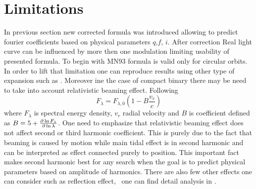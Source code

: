 \documentclass{pracalicmgr}
\begin{document}
\section{Limitations}
In previous section new corrected formula was introduced allowing to predict fourier coefficients based on physical parameters $q$,$f$, $i$. After correction 
Real light curve can be influenced by more then one modulation limiting usability of presented formula. To begin with MN93 formula is valid only for circular orbits. 
In order to lift that limitation one can reproduce results using other type of expansion such as \citet{engel_beer_2020}. Moreover ine the case of compact binary there may be need to take into account
relativistic beaming effect. Following \citet{loeb_periodic_2003} 
\begin{equation}
    F_{\lambda}=F_{\lambda,0}\left(1-B\frac{v_r}{c}\right)
\end{equation}
where $F_\lambda$ is spectral energy density, $v_r$ radial velocity and $B$ is coefficient defined as $B=5+\pdv{\ln{F_\lambda}}{\ln{\lambda}}$.
One need to emphasize that relativistic beaming effect does not affect second or third harmonic coefficient. This is purely due to the fact that beaming is caused by motion while
main tidal effect is in second harmonic and can be interpreted as effect connected purely to position. This important fact makes second harmonic best for any search when 
the goal is to predict physical parameters based on amplitude of harmonics. There are also few other effects one can consider such as reflection effect, \
one can find detail analysis in \citet{gomel_search_2021}.
\end{document}
